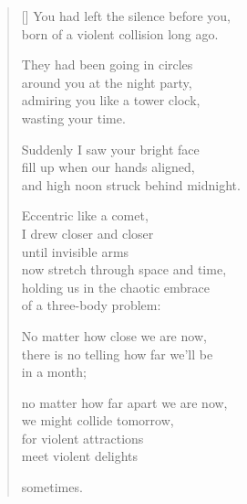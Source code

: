 \documentclass[12pt,a4paper]{article}
\begin{document}
\thispagestyle{empty}


\settowidth{\versewidth}{born of a violent collision long ago.}

\bigskip

\begin{verse}[\versewidth]
You had left the silence before you, \\
born of a violent collision long ago.

They had been going in circles \\
around you at the night party, \\
admiring you like a tower clock, \\
wasting your time.

Suddenly I saw your bright face \\
fill up when our hands aligned, \\
and high noon struck behind midnight.

Eccentric like a comet, \\
I drew closer and closer \\
until invisible arms \\
now stretch through space and time, \\
holding us in the chaotic embrace \\
of a three-body problem:

No matter how close we are now, \\
there is no telling how far we'll be \\
in a month;

no matter how far apart we are now, \\
we might collide tomorrow, \\
for violent attractions \\
meet violent delights

sometimes.
\end{verse}
\end{document}
